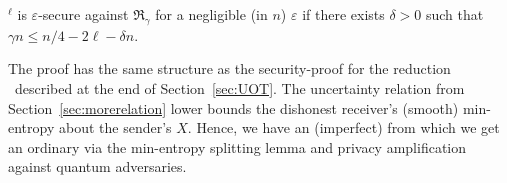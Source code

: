 \begin{theorem}\label{thm:OT}
  \Randqot$^{\ell}$ is $\varepsilon$-secure against
  $\mathfrak{R_\gamma}$ for a negligible (in $n$) $\varepsilon$ if
  there exists $\delta>0$ such that $\gamma n \leq n/4 - 2 \ell - \delta n$.
\end{theorem}
The proof has the same structure as the security-proof for the
reduction \OTUOT\ described at the end of Section~\ref{sec:UOT}. The
uncertainty relation
 from Section~\ref{sec:morerelation} lower bounds
the dishonest receiver's (smooth) min-entropy about the sender's $X$.
Hence, we have an (imperfect) 
from which we get an ordinary \RandlStringOT via the 
 min-entropy
splitting lemma and privacy amplification
 against quantum adversaries.
